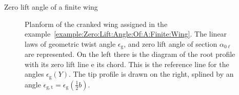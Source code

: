 \documentclass[[12pt,twoside]{book}
\begin{document}
\begin{myExampleX}{Zero lift angle of a finite wing}{}
\begin{figure}[t]
  \caption{
    Planform of the cranked wing
 assigned in the example~\ref{example:Zero:Lift:Angle:Of:A:Finite:Wing}.
    The linear laws of geometric twist angle $\epsilon_\mathrm{g}$, and zero lift angle of section $\alpha_{0\ell}$ are represented.
   On the left there is the diagram of the root profile with its zero lift line e its chord. This is the reference line for the angles $\epsilon_\mathrm{g}(Y)$. 
    The tip profile is drawn on the right, splined by an angle
    $\epsilon_{\mathrm{g,t}}=\epsilon_\mathrm{g}(\frac{1}{2}b)$.%
    }
  \label{fig:Zero:Lift:Basic:1}%
\end{figure}
%
\end{myExampleX}
\end{document}
